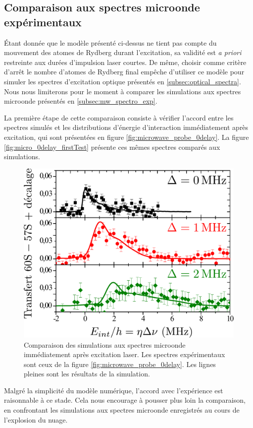 \subsection{Comparaison aux spectres microonde expérimentaux}
\noindent Étant donnée que le modèle présenté ci-dessus ne tient pas compte du mouvement des atomes de Rydberg durant l'excitation, sa validité est \textit{a priori} restreinte aux durées d'impulsion laser courtes.
De même, choisir comme critère d'arrêt le nombre d'atomes de Rydberg final empêche d'utiliser ce modèle pour simuler les spectres d'excitation optique présentés en \ref{subsec:optical_spectra}.
Nous nous limiterons pour le moment à comparer les simulations aux spectres microonde présentés en \ref{subsec:mw_spectro_exp}.

La première étape de cette comparaison consiste à vérifier l'accord entre les spectres simulés et les distributions d'énergie d'interaction immédiatement après excitation, qui sont présentées en figure \eqref{fig:microwave_probe_0delay}.
La figure \eqref{fig:micro_0delay_firstTest} présente ces mêmes spectres comparés aux simulations.
%
\begin{figure}[h]
\centering
\includegraphics[width=.7\linewidth]{figures/low_l/micro_0delay_firstTest_Tigrane}
\caption[Comparaison des simulations aux spectres microonde immédiatement après excitation laser]{
Comparaison des simulations aux spectres microonde immédiatement après excitation laser.
Les spectres expérimentaux sont ceux de la figure \ref{fig:microwave_probe_0delay}.
Les lignes pleines sont les résultats de la simulation.
}
\label{fig:micro_0delay_firstTest}
\end{figure}
%
Malgré la simplicité du modèle numérique, l'accord avec l'expérience est raisonnable à ce stade.
Cela nous encourage à pousser plus loin la comparaison, en confrontant les simulations aux spectres microonde enregistrés au cours de l'explosion du nuage.

